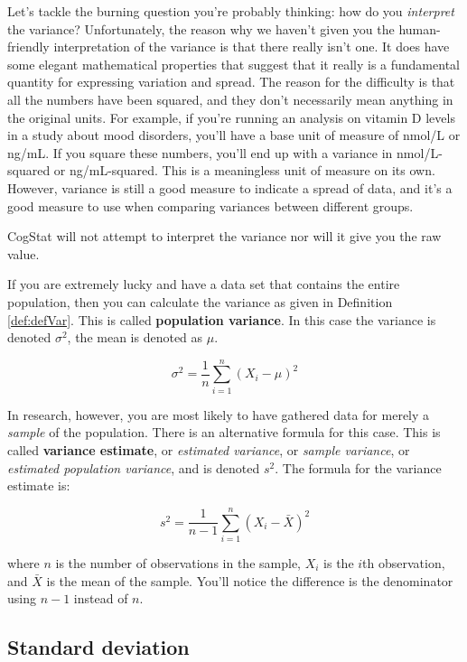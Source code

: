 \documentclass[
  11pt,
]{book}
\theoremstyle{definition}
\theoremstyle{definition}
\theoremstyle{definition}
\theoremstyle{definition}
\theoremstyle{remark}
\begin{document}
Let's tackle the burning question you're probably thinking: how do you \emph{interpret} the variance? Unfortunately, the reason why we haven't given you the human-friendly interpretation of the variance is that there really isn't one. It does have some elegant mathematical properties that suggest that it really is a fundamental quantity for expressing variation and spread. The reason for the difficulty is that all the numbers have been squared, and they don't necessarily mean anything in the original units. For example, if you're running an analysis on vitamin D levels in a study about mood disorders, you'll have a base unit of measure of nmol/L or ng/mL. If you square these numbers, you'll end up with a variance in nmol/L-squared or ng/mL-squared. This is a meaningless unit of measure on its own. However, variance is still a good measure to indicate a spread of data, and it's a good measure to use when comparing variances between different groups.

CogStat will not attempt to interpret the variance nor will it give you the raw value.

\hypertarget{calloutVar}{}
\begin{callout}

If you are extremely lucky and have a data set that contains the entire population, then you can calculate the variance as given in Definition \ref{def:defVar}. This is called \textbf{population variance}. In this case the variance is denoted \(\sigma^2\), the mean is denoted as \(\mu\).

\[
\sigma^2 = \frac{1}{n} \sum_{i=1}^n (X_i - \mu)^2
\]

In research, however, you are most likely to have gathered data for merely a \emph{sample} of the population. There is an alternative formula for this case. This is called \textbf{variance estimate}, or \emph{estimated variance}, or \emph{sample variance}, or \emph{estimated population variance}, and is denoted \(s^2\). The formula for the variance estimate is:

\[
s^2 = \frac{1}{n-1} \sum_{i=1}^n (X_i - \bar{X})^2
\]

where \(n\) is the number of observations in the sample, \(X_i\) is the \(i\)th observation, and \(\bar{X}\) is the mean of the sample. You'll notice the difference is the denominator using \(n-1\) instead of \(n\).

\end{callout}

\hypertarget{sd}{%
\subsection{Standard deviation}\label{sd}}
\end{document}
